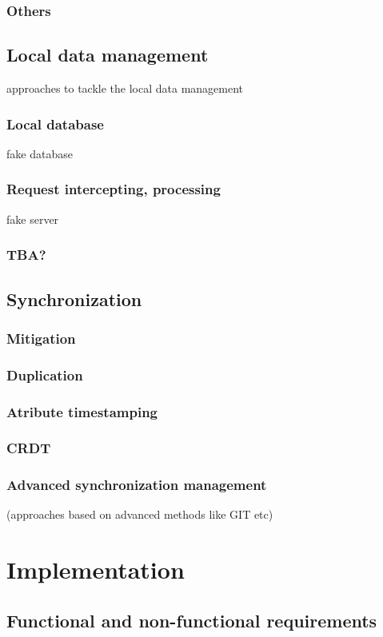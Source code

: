 \documentclass[
  digital,     %
  color,       %
  oneside,     %
  nosansbold,  %
  nocolorbold, %
  lof,         %
  lot,         %
]{fithesis4}
\begin{document}
\subsection{Others}
\section{Local data management}
approaches to tackle the local data management
\subsection{Local database}
fake database
\subsection{Request intercepting, processing}
fake server
\subsection{TBA?}
\section{Synchronization}
\subsection{Mitigation}
\subsection{Duplication}
\subsection{Atribute timestamping}
\subsection{CRDT}
\subsection{Advanced synchronization management}
(approaches based on advanced methods like GIT etc)

\chapter{Implementation}
\section{Functional and non-functional requirements}
\end{document}
